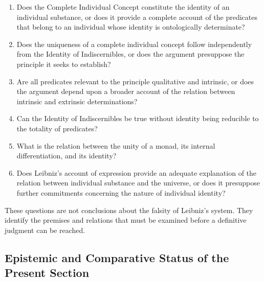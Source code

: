 \begin{enumerate}
    \item Does the Complete Individual Concept
    constitute the identity of an individual
    substance, or does it provide a complete
    account of the predicates that belong
    to an individual whose identity is
    ontologically determinate?

    \item Does the uniqueness of a complete
    individual concept follow independently
    from the Identity of Indiscernibles,
    or does the argument presuppose the
    principle it seeks to establish?

    \item Are all predicates relevant to
    the principle qualitative and intrinsic,
    or does the argument depend upon
    a broader account of the relation
    between intrinsic and extrinsic
    determinations?

    \item Can the Identity of Indiscernibles
    be true without identity being reducible
    to the totality of predicates?

    \item What is the relation between the
    unity of a monad, its internal
    differentiation, and its identity?

    \item Does Leibniz's account of expression
    provide an adequate explanation of
    the relation between individual substance
    and the universe, or does it presuppose
    further commitments concerning the
    nature of individual identity?
\end{enumerate}

These questions are not conclusions about
the falsity of Leibniz's system. They identify
the premises and relations that must be
examined before a definitive judgment
can be reached.



\subsection*{Epistemic and Comparative Status of the Present Section}

\label{para:VS.B01.P01.C08.S07.SS12.P001}

